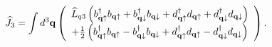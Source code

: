\begin{equation*}
\widehat{J}_{3}=\int d^{3}\mathbf{q}\left( 
\begin{array}{c}
\widehat{L}_{q3}\left( b_{\mathbf{q}\uparrow }^{\dagger }b_{\mathbf{q}%
\uparrow }+b_{\mathbf{q}\downarrow }^{\dagger }b_{\mathbf{q}\downarrow }+d_{%
\mathbf{q}\uparrow }^{\dagger }d_{\mathbf{q}\uparrow }+d_{\mathbf{q}%
\downarrow }^{\dagger }d_{\mathbf{q}\downarrow }\right) \\ 
+\frac{1}{2}\left( b_{\mathbf{q}\uparrow }^{\dagger }b_{\mathbf{q}\uparrow
}-b_{\mathbf{q}\downarrow }^{\dagger }b_{\mathbf{q}\downarrow }+d_{\mathbf{q}%
\uparrow }^{\dagger }d_{\mathbf{q}\uparrow }-d_{\mathbf{q}\downarrow
}^{\dagger }d_{\mathbf{q}\downarrow }\right)
\end{array}
\right) .
\end{equation*}

